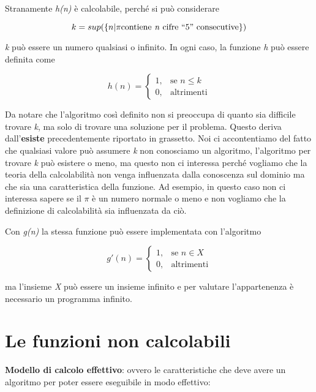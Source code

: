 Stranamente \emph{h(n)} è calcolabile, perché si può considerare

$$
k = sup( \{n | \pi \text{contiene \textit{n} cifre ``5'' consecutive}\} )
$$

\emph{k} può essere un numero qualsiasi o infinito. In ogni caso, la
funzione \emph{h} può essere definita come


$$
h(n) = \begin{cases}
1, &\text{se }  n \leq k\\
0, &\text{altrimenti}
\end{cases}
$$

Da notare che l'algoritmo così definito non si preoccupa di quanto sia
difficile trovare \emph{k}, ma solo di trovare una soluzione per il
problema.
 Questo deriva dall'\textbf{esiste} precedentemente riportato in
grassetto.
Noi ci accontentiamo del fatto che qualsiasi valore può
assumere \emph{k} non conosciamo un algoritmo, l'algoritmo per trovare
\emph{k} può esistere o meno, ma questo non ci interessa perché vogliamo
che la teoria della calcolabilità non venga influenzata dalla conoscenza
sul dominio ma che sia una caratteristica della funzione. 
Ad esempio, in questo caso non ci interessa sapere se il $\pi$ è un numero normale o
meno e non vogliamo che la definizione di calcolabilità sia influenzata
da ciò.

Con \emph{g(n)} la stessa funzione può essere implementata con
l'algoritmo


$$
g'(n) = \begin{cases}
1, &\text{se } n \in X \\
0, &\text{altrimenti}
\end{cases}
$$

ma l'insieme \emph{X} può essere un insieme infinito e per valutare
l'appartenenza è necessario un programma infinito.

\section{Le funzioni non calcolabili}\label{le-funzioni-non-calcolabili}

\textbf{Modello di calcolo effettivo}: ovvero le caratteristiche che
deve avere un algoritmo per poter essere eseguibile in modo effettivo:

